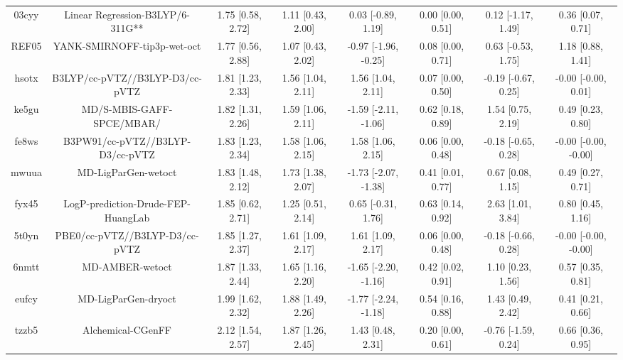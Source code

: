 \documentclass{article}
\begin{document}
\begin{center}
\begin{longtable}{|cccccccc|}
 03cyy &                   Linear Regression-B3LYP/6-311G** &  1.75 [0.58, 2.72] &  1.11 [0.43, 2.00] &    0.03 [-0.89, 1.19] &  0.00 [0.00, 0.51] &   0.12 [-1.17, 1.49] &     0.36 [0.07, 0.71] \\
 REF05 &                        YANK-SMIRNOFF-tip3p-wet-oct &  1.77 [0.56, 2.88] &  1.07 [0.43, 2.02] &  -0.97 [-1.96, -0.25] &  0.08 [0.00, 0.71] &   0.63 [-0.53, 1.75] &     1.18 [0.88, 1.41] \\
 hsotx &                    B3LYP/cc-pVTZ//B3LYP-D3/cc-pVTZ &  1.81 [1.23, 2.33] &  1.56 [1.04, 2.11] &     1.56 [1.04, 2.11] &  0.07 [0.00, 0.50] &  -0.19 [-0.67, 0.25] &   -0.00 [-0.00, 0.01] \\
 ke5gu &                          MD/S-MBIS-GAFF-SPCE/MBAR/ &  1.82 [1.31, 2.26] &  1.59 [1.06, 2.11] &  -1.59 [-2.11, -1.06] &  0.62 [0.18, 0.89] &    1.54 [0.75, 2.19] &     0.49 [0.23, 0.80] \\
 fe8ws &                   B3PW91/cc-pVTZ//B3LYP-D3/cc-pVTZ &  1.83 [1.23, 2.34] &  1.58 [1.06, 2.15] &     1.58 [1.06, 2.15] &  0.06 [0.00, 0.48] &  -0.18 [-0.65, 0.28] &  -0.00 [-0.00, -0.00] \\
 mwuua &                                MD-LigParGen-wetoct &  1.83 [1.48, 2.12] &  1.73 [1.38, 2.07] &  -1.73 [-2.07, -1.38] &  0.41 [0.01, 0.77] &    0.67 [0.08, 1.15] &     0.49 [0.27, 0.71] \\
 fyx45 &                 LogP-prediction-Drude-FEP-HuangLab &  1.85 [0.62, 2.71] &  1.25 [0.51, 2.14] &    0.65 [-0.31, 1.76] &  0.63 [0.14, 0.92] &    2.63 [1.01, 3.84] &     0.80 [0.45, 1.16] \\
 5t0yn &                     PBE0/cc-pVTZ//B3LYP-D3/cc-pVTZ &  1.85 [1.27, 2.37] &  1.61 [1.09, 2.17] &     1.61 [1.09, 2.17] &  0.06 [0.00, 0.48] &  -0.18 [-0.66, 0.28] &  -0.00 [-0.00, -0.00] \\
 6nmtt &                                    MD-AMBER-wetoct &  1.87 [1.33, 2.44] &  1.65 [1.16, 2.20] &  -1.65 [-2.20, -1.16] &  0.42 [0.02, 0.91] &    1.10 [0.23, 1.56] &     0.57 [0.35, 0.81] \\
 eufcy &                                MD-LigParGen-dryoct &  1.99 [1.62, 2.32] &  1.88 [1.49, 2.26] &  -1.77 [-2.24, -1.18] &  0.54 [0.16, 0.88] &    1.43 [0.49, 2.42] &     0.41 [0.21, 0.66] \\
 tzzb5 &                                  Alchemical-CGenFF &  2.12 [1.54, 2.57] &  1.87 [1.26, 2.45] &     1.43 [0.48, 2.31] &  0.20 [0.00, 0.61] &  -0.76 [-1.59, 0.24] &     0.66 [0.36, 0.95] \\

\end{longtable}
\end{center}
\end{document}
